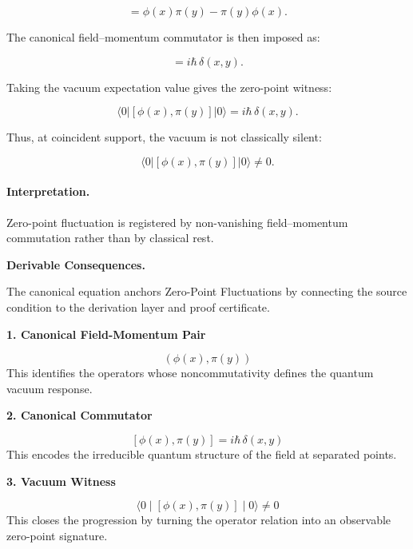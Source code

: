 \begin{equation}
[\phi(x),\pi(y)]
=
\phi(x)\pi(y)-\pi(y)\phi(x).
\end{equation}

The canonical field--momentum commutator is then imposed as:

\begin{equation}
[\phi(x),\pi(y)] = i\hbar\,\delta(x,y).
\end{equation}

Taking the vacuum expectation value gives the zero-point witness:

\begin{equation}
\langle 0|[\phi(x),\pi(y)]|0\rangle
=
i\hbar\,\delta(x,y).
\end{equation}

Thus, at coincident support, the vacuum is not classically silent:

\begin{equation}
\boxed{
\langle 0|[\phi(x),\pi(y)]|0\rangle \neq 0 .
}
\end{equation}

\paragraph{Interpretation.}
Zero-point fluctuation is registered by non-vanishing field--momentum commutation rather than by classical rest.

\par\vspace{0.35em}
\noindent\textbf{Derivable Consequences.}\quad
\begingroup
\footnotesize
\raggedright
The canonical equation anchors Zero-Point Fluctuations by connecting the source condition to the derivation layer and proof certificate.
\par\endgroup

\noindent\textbf{1. Canonical Field-Momentum Pair}\par
\[
(\phi(x), \pi(y))
\]
\noindent This identifies the operators whose noncommutativity defines the quantum vacuum response.\par
\noindent\textbf{2. Canonical Commutator}\par
\[
\left[\phi(x),\pi(y)\right] = i\hbar\,\delta(x,y)
\]
\noindent This encodes the irreducible quantum structure of the field at separated points.\par
\noindent\textbf{3. Vacuum Witness}\par
\[
\langle 0 \mid \left[\phi(x),\pi(y)\right] \mid 0 \rangle \neq 0
\]
\noindent This closes the progression by turning the operator relation into an observable zero-point signature.\par

